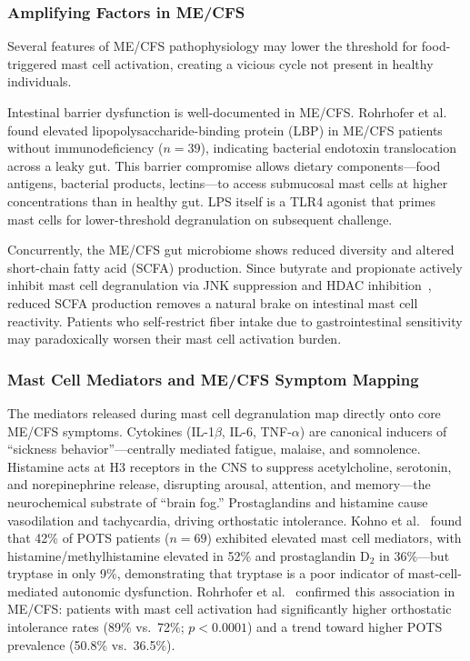 \subsubsection{Amplifying Factors in ME/CFS}

Several features of ME/CFS pathophysiology may lower the threshold for food-triggered mast cell activation, creating a vicious cycle not present in healthy individuals.

Intestinal barrier dysfunction is well-documented in ME/CFS. Rohrhofer et al.~\cite{Rohrhofer2024stratification} found elevated lipopolysaccharide-binding protein (LBP) in ME/CFS patients without immunodeficiency ($n = 39$), indicating bacterial endotoxin translocation across a leaky gut. This barrier compromise allows dietary components---food antigens, bacterial products, lectins---to access submucosal mast cells at higher concentrations than in healthy gut. LPS itself is a TLR4 agonist that primes mast cells for lower-threshold degranulation on subsequent challenge.

Concurrently, the ME/CFS gut microbiome shows reduced diversity and altered short-chain fatty acid (SCFA) production. Since butyrate and propionate actively inhibit mast cell degranulation via JNK suppression and HDAC inhibition~\cite{Folkerts2018fiber}, reduced SCFA production removes a natural brake on intestinal mast cell reactivity. Patients who self-restrict fiber intake due to gastrointestinal sensitivity may paradoxically worsen their mast cell activation burden.

\subsubsection{Mast Cell Mediators and ME/CFS Symptom Mapping}

The mediators released during mast cell degranulation map directly onto core ME/CFS symptoms. Cytokines (IL-1$\beta$, IL-6, TNF-$\alpha$) are canonical inducers of ``sickness behavior''---centrally mediated fatigue, malaise, and somnolence. Histamine acts at H3 receptors in the CNS to suppress acetylcholine, serotonin, and norepinephrine release, disrupting arousal, attention, and memory---the neurochemical substrate of ``brain fog.'' Prostaglandins and histamine cause vasodilation and tachycardia, driving orthostatic intolerance. Kohno et al.~\cite{Kohno2021potsmast} found that 42\% of POTS patients ($n = 69$) exhibited elevated mast cell mediators, with histamine/methylhistamine elevated in 52\% and prostaglandin D$_2$ in 36\%---but tryptase in only 9\%, demonstrating that tryptase is a poor indicator of mast-cell-mediated autonomic dysfunction. Rohrhofer et al.~\cite{Rohrhofer2025mecfsmast} confirmed this association in ME/CFS: patients with mast cell activation had significantly higher orthostatic intolerance rates (89\% vs.\ 72\%; $p < 0.0001$) and a trend toward higher POTS prevalence (50.8\% vs.\ 36.5\%).

